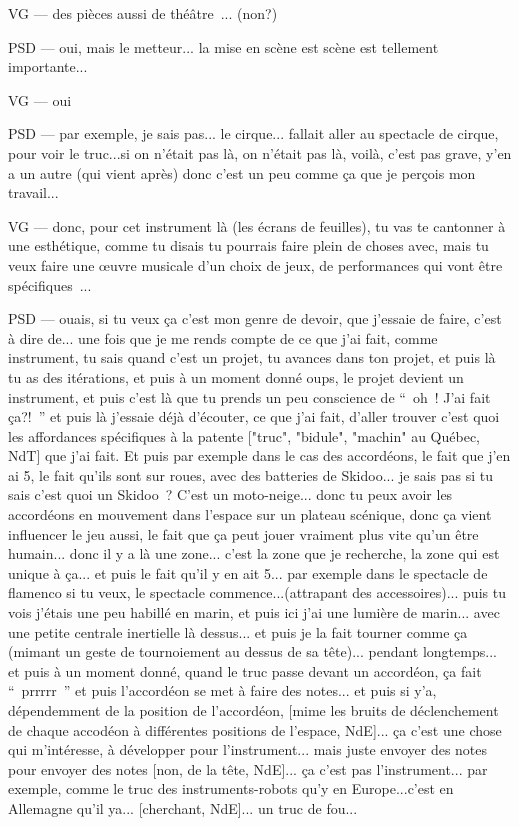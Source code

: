 VG — des pièces aussi de théâtre ... (non?)

PSD — oui, mais le metteur... la mise en scène est scène est tellement importante... 

VG — oui

PSD — par exemple, je sais pas... le cirque... fallait aller au spectacle de cirque, pour voir le truc...si on n'était pas là, on n'était pas là, voilà, c'est pas grave, y'en a un autre (qui vient après) donc c'est un peu comme ça que je perçois mon travail... 

VG — donc, pour cet instrument là (les écrans de feuilles), tu vas te cantonner à une esthétique, comme tu disais tu pourrais faire plein de choses avec, mais tu veux faire une œuvre musicale d'un choix de jeux, de performances qui vont être spécifiques ...

PSD — ouais, si tu veux ça c'est mon genre de devoir, que j'essaie de faire, c'est à dire de... une fois que je me rends compte de ce que j'ai fait, comme instrument, tu sais quand c'est un projet, tu avances dans ton projet, et puis là tu as des itérations, et puis à un moment donné oups, le projet devient un instrument, et puis c'est là que tu prends un peu conscience de “ oh ! J'ai fait ça?! ” et puis là j'essaie déjà d'écouter, ce que j'ai fait, d'aller trouver c'est quoi les affordances spécifiques à la patente ["truc", "bidule", "machin" au Québec,  NdT] que j'ai fait. Et puis par exemple dans le cas des accordéons, le fait que j'en ai 5, le fait qu'ils sont sur roues, avec des batteries de Skidoo... je sais pas si tu sais c'est quoi un Skidoo ? C'est un moto-neige... donc tu peux avoir les accordéons en mouvement dans l'espace sur un plateau scénique, donc ça vient influencer le jeu aussi, le fait que ça peut jouer vraiment plus vite qu'un être humain... donc il y a là une zone... c'est la zone que je recherche, la zone qui est unique à ça... et puis le fait qu'il y en ait 5... par exemple dans le spectacle de flamenco si tu veux, le spectacle commence...(attrapant des accessoires)... puis tu vois j'étais une peu habillé en marin, et puis ici j'ai une lumière de marin... avec une petite centrale inertielle là dessus... et puis je la fait tourner comme ça (mimant un geste de tournoiement au dessus de sa tête)... pendant longtemps... et puis à un moment donné, quand le truc passe devant un accordéon, ça fait “ prrrrr ” et puis l'accordéon se met à faire des notes... et puis si y'a, dépendemment de la position de l'accordéon, [mime les bruits de déclenchement de chaque accodéon à différentes positions de l'espace, NdE]... ça c'est une chose qui m'intéresse, à développer pour l'instrument... mais juste envoyer des notes pour envoyer des notes [non, de la tête, NdE]... ça c'est pas l'instrument... par exemple, comme le truc des instruments-robots qu'y en Europe...c'est en Allemagne qu'il ya... [cherchant, NdE]... un truc de fou... 

